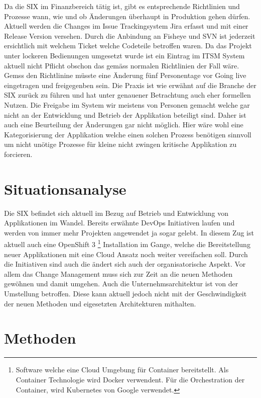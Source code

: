 Da die SIX im Finanzbereich tätig ist, gibt es entsprechende Richtlinien und Prozesse wann, wie und ob Änderungen überhaupt in Produktion gehen dürfen. Aktuell werden die Changes im Issue Trackingsystem Jira erfasst und mit einer Release Version versehen. Durch die Anbindung an Fisheye und SVN ist jederzeit ersichtlich mit welchem Ticket welche Codeteile betroffen waren. Da das Projekt unter lockeren Bedienungen umgesetzt wurde ist ein Eintrag im ITSM System aktuell nicht Pflicht obschon das gemäss normalen Richtlinien der Fall wäre. 
Gemss den Richtlinine müsste eine Änderung fünf Personentage vor Going live eingetragen und freigegenben sein. Die Praxis ist wie erwähnt auf die Branche der SIX zurück zu führen und hat unter genauener Betrachtung auch eher formellen Nutzen. Die Freigabe im System wir meistens von Personen gemacht welche gar nicht an der Entwicklung und Betrieb der Applikation beteiligt sind. Daher ist auch eine Beurteilung der Änderungen gar nicht möglich. Hier wäre wohl eine Kategorisierung der Applikation welche einen solchen Prozess benötigen sinnvoll um nicht unötige Prozesse für kleine nicht zwingen kritische Applikation zu forcieren.

\section{Situationsanalyse}

Die SIX befindet sich aktuell im Bezug auf Betrieb und Entwicklung von Applikationen im Wandel. Bereits erwähnte DevOps Initiativen laufen und werden von immer mehr Projekten angewendet ja sogar gelebt. In diesem Zug ist aktuell auch eine OpenShift 3 \footnote{Software welche eine Cloud Umgebung für Container bereitstellt. Als Container Technologie wird Docker verwendent. Für die Orchestration der Container, wird Kubernetes von Google verwendet.} Installation im Gange, welche die Bereitstellung neuer Applikationen mit eine Cloud Ansatz noch weiter vereifachen soll.
Durch die Initiativen sind auch die ändert sich auch der organisatorische Aspekt. Vor allem das Change Management muss sich zur Zeit an die neuen Methoden gewöhnen und damit umgehen.
Auch die Unternehmsarchitektur ist von der Umstellung betroffen. Diese kann aktuell jedoch nicht mit der Geschwindigkeit der neuen Methoden und eigesetzten Architekturen mithalten. 

\section{Methoden}

